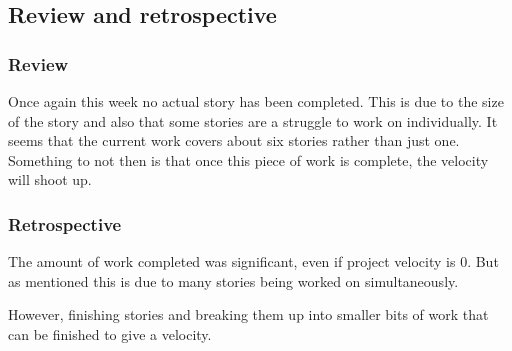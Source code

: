 \subsection{Review and retrospective}
\subsubsection{Review}
Once again this week no actual story has been completed. This is due to the size of the story and also that some stories are a struggle to work on individually. It seems that the current work covers about six stories rather than just one. Something to not then is that once this piece of work is complete, the velocity will shoot up.

\subsubsection{Retrospective}
The amount of work completed was significant, even if project velocity is 0. But as mentioned this is due to many stories being worked on simultaneously.

However, finishing stories and breaking them up into smaller bits of work that can be finished to give a velocity.
\newpage
